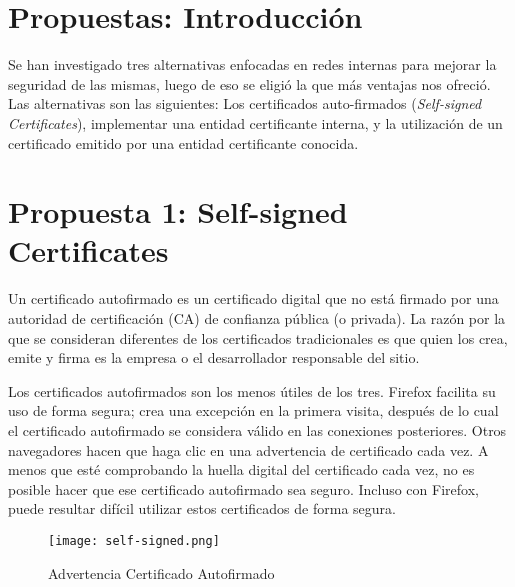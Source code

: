 
\section{Propuestas: Introducción}

Se han investigado tres alternativas enfocadas en redes internas para mejorar la seguridad de las 
mismas, luego de eso se eligió la que más ventajas nos ofreció.
Las alternativas son las siguientes: Los certificados auto-firmados (\emph{Self-signed Certificates}), implementar
una entidad certificante interna, y la utilización de un certificado emitido por una entidad
certificante conocida.

\section{Propuesta 1: Self-signed Certificates}

Un certificado autofirmado es un certificado digital que no está firmado por una 
autoridad de certificación (CA) de confianza pública (o privada). 
La razón por la que se consideran diferentes de los certificados tradicionales es que 
quien los crea, emite y firma es la empresa o el desarrollador responsable del sitio. 

Los certificados autofirmados son los menos útiles de los tres. Firefox facilita su uso 
de forma segura; crea una excepción en la primera visita, después de lo cual el 
certificado autofirmado se considera válido en las conexiones posteriores. Otros 
navegadores hacen que haga clic en una advertencia de certificado cada vez. A menos 
que esté comprobando la huella digital del certificado cada vez, no es posible hacer 
que ese certificado autofirmado sea seguro. Incluso con Firefox, puede resultar 
difícil utilizar estos certificados de forma segura.

\begin{center}
   \begin{figure}   
      \begin{center}
         \texttt{[image: self-signed.png]}
      \end{center}
      \caption{Advertencia Certificado Autofirmado}
   \end{figure}
\end{center}

